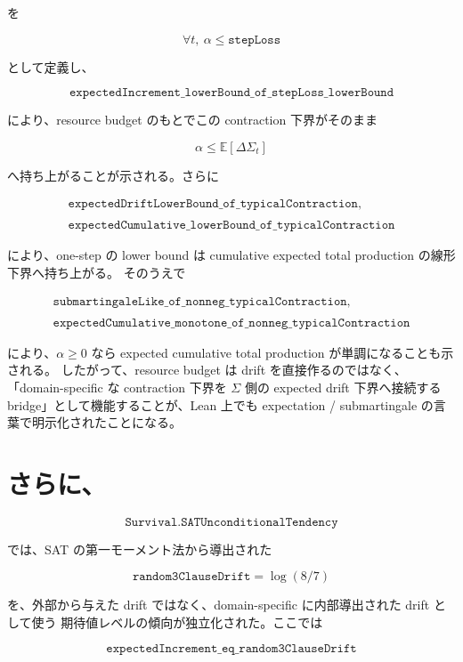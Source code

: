 \documentclass[12pt,a4paper]{article}
\begin{document}
を

\[
\forall t,\ \alpha \le \texttt{stepLoss}
\]

として定義し、

\[
\texttt{expectedIncrement\_lowerBound\_of\_stepLoss\_lowerBound}
\]

により、resource budget のもとでこの contraction 下界がそのまま

\[
\alpha \le \mathbb E[\Delta \Sigma_{t}]
\]

へ持ち上がることが示される。さらに

\[
\begin{aligned}
\texttt{expectedDriftLowerBound\_of\_typicalContraction}, \\
\qquad \\
\texttt{expectedCumulative\_lowerBound\_of\_typicalContraction}
\end{aligned}
\]

により、one-step の lower bound は cumulative expected total production の線形下界へ持ち上がる。 そのうえで

\[
\begin{aligned}
\texttt{submartingaleLike\_of\_nonneg\_typicalContraction}, \\
\qquad \\
\texttt{expectedCumulative\_monotone\_of\_nonneg\_typicalContraction}
\end{aligned}
\]

により、\(\alpha \ge 0\) なら expected cumulative total production が単調になることも示される。 したがって、resource budget は drift を直接作るのではなく、「domain-specific な contraction 下界を \(\Sigma\) 側の expected drift 下界へ接続する bridge」として機能することが、Lean 上でも expectation / submartingale の言葉で明示化されたことになる。

\section{さらに、}\label{ux3055ux3089ux306b-14}

\[
\texttt{Survival.SATUnconditionalTendency}
\]

では、SAT の第一モーメント法から導出された

\[
\texttt{random3ClauseDrift}=\log(8/7)
\]

を、外部から与えた drift ではなく、domain-specific に内部導出された drift として使う 期待値レベルの傾向が独立化された。ここでは

\[
\texttt{expectedIncrement\_eq\_random3ClauseDrift}
\]
\end{document}

